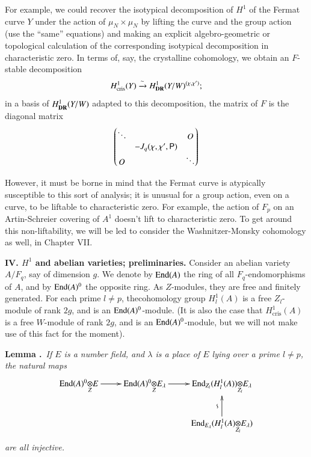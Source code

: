 For example, we could recover the isotypical decomposition of $H^{1}$ of the Fermat curve $Y$ under the action of $\mu_{N}\times \mu_{N}$ by lifting the curve and the group action (use the ``same'' equations) and making an explicit algebro-geometric or topological calculation of the corresponding isotypical decomposition in characteristic zero. In terms of, say, the crystalline cohomology, we obtain an $F$-stable decomposition
$$
H^{1}_{\text{cris}}(Y)\xrightarrow{\sim}H^{1}_{\mathbf{DR}}(Y/W)^{(\chi,\chi')};
$$
in a basis of $H^{1}_{\mathbf{DR}}(Y/W)$ adapted to this decomposition, the matrix of $F$ is the diagonal matrix
$$
\left(
\begin{matrix}
\ddots & & O\\
       & -J_{q}(\chi,\chi',\mathsf{P}) &\\
O & & \ddots
\end{matrix}
\right)
$$

However, it must be borne in mind that the Fermat curve is atypically susceptible to this sort of analysis; it is unusual for a group action, even on a curve, to be liftable to characteristic zero. For example, the action of $F_{p}$ on an Artin-Schreier covering of $A^{1}$ doesn't lift to characteristic zero. To get around this non-liftability, we will be led to consider the Washnitzer-Monsky cohomology as well, in Chapter VII.

\bigskip
\noindent
{\bf IV. {\boldmath$H^{1}$} and abelian varieties; preliminaries.} Consider an abelian variety $A/F_{q}$, say of dimension $g$. We denote by $\operatorname{End}(A)$ the ring of all $F_{q}$-endomorphisms of $A$, and by $\operatorname{End}(A)^{0}$ the opposite ring. As $Z$-modules, they are free and finitely generated. For each prime $l\neq p$, the\pageoriginale cohomology group $H^{1}_{l}(A)$ is a free $Z_{l}$-module of rank $2g$, and is an $\operatorname{End} (A)^{0}$-module. (It is also the case that $H^{1}_{\text{cris}}(A)$ is a free $W$-module of rank $2g$, and is an $\operatorname{End}(A)^{0}$-module, but we will not make use of this fact for the moment).

\medskip
\noindent
{\bf Lemma .\label{art6-lem4.1}}~{\em If $E$ is a number field, and $\lambda$ is a place of $E$ lying over a prime $l\neq p$, the natural maps}
\[
\xymatrix{
\foprod{\End(A)^{0}}{E}{Z}\ar[r] & \foprod{\End(A)^{0}}{E_{\lambda}}{Z}\ar[r] & \foprod{\End_{Z_{l}}(H^{1}_{l}(A))}{E_{\lambda}}{Z_{l}}\\
                                &                                         & \End_{E_{\lambda}}(\foprod{H^{1}_{l}(A)}{E_{\lambda}}{Z_{l}})\ar[u]^-{\rotatebox{90}{$\backsim$}}
}
\]
{\em are all injective.}

